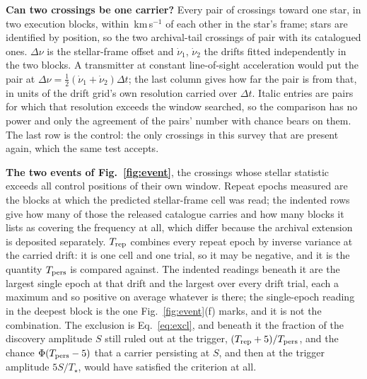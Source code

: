 \begin{table}
\centering
\caption{\textbf{Can two crossings be one carrier?} Every pair of crossings
toward one star, in two execution blocks, within
\WdHalfKms\,km\,s$^{-1}$ of each other in the star's frame; stars are
identified by position, so the two archival-tail crossings of \TjDeepStar{}
pair with its catalogued ones. $\Delta\nu$ is the stellar-frame offset and
$\dot\nu_1$, $\dot\nu_2$ the drifts fitted independently in the two blocks.
A transmitter at constant line-of-sight acceleration would put the pair at
$\Delta\nu=\frac{1}{2}(\dot\nu_1+\dot\nu_2)\Delta t$; the last column gives
how far the pair is from that, in units of the drift grid's own resolution
carried over $\Delta t$. Italic entries are pairs for which that resolution
exceeds the window searched, so the comparison has no power and only the
agreement of the pairs' number with chance bears on them. The last row is the
control: the only crossings in this survey that are present again, which the
same test accepts.}
\label{tab:pairs}
\scriptsize

\end{table}

\begin{table}
\centering
\caption{\textbf{The two events of Fig.~\ref{fig:event}}, the crossings whose
stellar statistic exceeds all \NCtrl{} control positions of their own window.
Repeat epochs measured are the blocks at which the predicted stellar-frame
cell was read; the indented rows give how many of those the released catalogue
carries and how many blocks it lists as covering the frequency at all, which
differ because the archival extension is deposited separately. $T_{\rm rep}$
combines every repeat epoch by inverse variance at the carried drift: it is
one cell and one trial, so it may be negative, and it is the quantity
$T_{\rm pers}$ is compared against. The indented readings beneath it are the
largest single epoch at that drift and the largest over every drift trial,
each a maximum and so positive on average whatever is there; the
single-epoch reading in the deepest block is the one Fig.~\ref{fig:event}(f)
marks, and it is not the combination. The exclusion is Eq.~\ref{eq:excl}, and
beneath it the fraction of the discovery amplitude $S$ still ruled out at the
trigger, $(T_{\rm rep}+5)/T_{\rm pers}$, and the chance
$\Phi(T_{\rm pers}-5)$ that a carrier persisting at $S$, and then at the
trigger amplitude $5S/T_\star$, would have satisfied the criterion at all.}
\label{tab:cand}
\footnotesize

\end{table}

